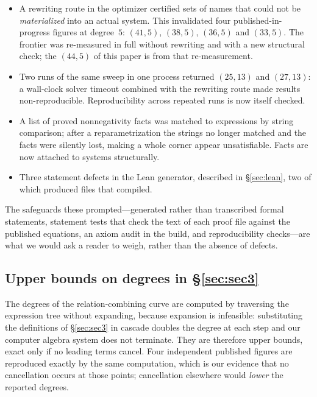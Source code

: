 \begin{itemize}[nosep]
  \item A rewriting route in the optimizer certified sets of names that could
        not be \emph{materialized} into an actual system. This invalidated four
        published-in-progress figures at degree~$5$: $(41,5)$, $(38,5)$,
        $(36,5)$ and $(33,5)$. The frontier was re-measured in full without
        rewriting and with a new structural check; the $(44,5)$ of this paper is
        from that re-measurement.
  \item Two runs of the same sweep in one process returned $(25,13)$ and
        $(27,13)$: a wall-clock solver timeout combined with the rewriting route
        made results non-reproducible. Reproducibility across repeated runs is
        now itself checked.
  \item A list of proved nonnegativity facts was matched to expressions by
        string comparison; after a reparametrization the strings no longer
        matched and the facts were silently lost, making a whole corner appear
        unsatisfiable. Facts are now attached to systems structurally.
  \item Three statement defects in the Lean generator, described in
        \S\ref{sec:lean}, two of which produced files that compiled.
\end{itemize}

The safeguards these prompted---generated rather than transcribed formal
statements, statement tests that check the text of each proof file against the
published equations, an axiom audit in the build, and reproducibility
checks---are what we would ask a reader to weigh, rather than the absence of
defects.

\subsection{Upper bounds on degrees in \texorpdfstring{\S\ref{sec:sec3}}{Section 6}}

The degrees of the relation-combining curve are computed by traversing the
expression tree without expanding, because expansion is infeasible: substituting
the definitions of \S\ref{sec:sec3} in cascade doubles the degree at each step
and our computer algebra system does not terminate. They are therefore upper
bounds, exact only if no leading terms cancel. Four independent published
figures are reproduced exactly by the same computation, which is our evidence
that no cancellation occurs at those points; cancellation elsewhere would
\emph{lower} the reported degrees.

